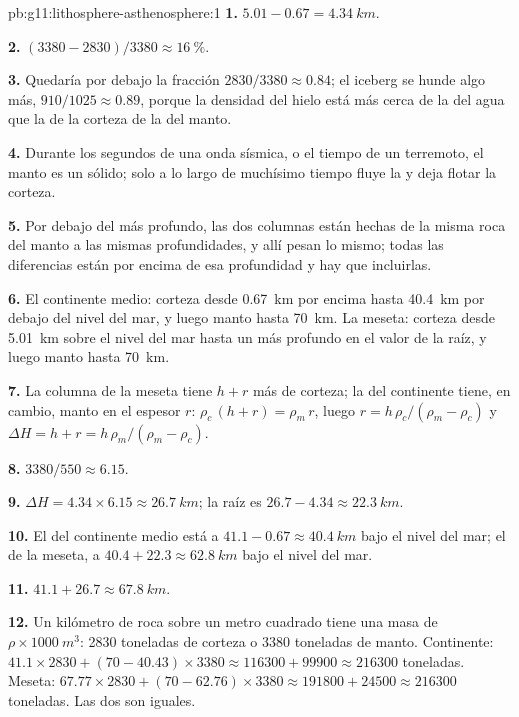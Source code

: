 \begin{solution}{pb:g11:lithosphere-asthenosphere:1}
\textbf{1.} $5.01 - 0.67 = \qty{4.34}{km}$.

\textbf{2.} $(3380 - 2830)/3380 \approx \qty{16}{\percent}$.

\textbf{3.} Quedaría por debajo la fracción $2830/3380 \approx 0.84$; el
iceberg se hunde algo más, $910/1025 \approx 0.89$, porque la densidad del
hielo está más cerca de la del agua que la de la corteza de la del manto.

\textbf{4.} Durante los segundos de una onda sísmica, o el tiempo de un
terremoto, el manto es un sólido; solo a lo largo de muchísimo tiempo fluye
la  y deja flotar la corteza.

\textbf{5.} Por debajo del  más profundo, las dos columnas están hechas
de la misma roca del manto a las mismas profundidades, y allí pesan lo mismo;
todas las diferencias están por encima de esa profundidad y hay que
incluirlas.

\textbf{6.} El continente medio: corteza desde \qty{0.67}{km} por encima
hasta \qty{40.4}{km} por debajo del nivel del mar, y luego manto hasta
\qty{70}{km}. La meseta: corteza desde \qty{5.01}{km} sobre el nivel del mar
hasta un  más profundo en el valor de la raíz, y luego manto hasta
\qty{70}{km}.

\textbf{7.} La columna de la meseta tiene $h + r$ más de corteza; la del
continente tiene, en cambio, manto en el espesor $r$: $\rho_c\,(h + r) = \rho_m\,r$,
luego $r = h\,\rho_c/(\rho_m - \rho_c)$ y $\Delta H = h + r =
h\,\rho_m/(\rho_m - \rho_c)$.

\textbf{8.} $3380/550 \approx 6.15$.

\textbf{9.} $\Delta H = 4.34 \times 6.15 \approx \qty{26.7}{km}$; la raíz es
$26.7 - 4.34 \approx \qty{22.3}{km}$.

\textbf{10.} El  del continente medio está a $41.1 - 0.67 \approx
\qty{40.4}{km}$ bajo el nivel del mar; el de la meseta, a $40.4 + 22.3 \approx
\qty{62.8}{km}$ bajo el nivel del mar.

\textbf{11.} $41.1 + 26.7 \approx \qty{67.8}{km}$.

\textbf{12.} Un kilómetro de roca sobre un metro cuadrado tiene una masa de
$\rho \times \qty{1000}{m^3}$: \num{2830} toneladas de corteza o \num{3380}
toneladas de manto. Continente: $41.1 \times 2830 + (70 - 40.43) \times 3380
\approx \num{116300} + \num{99900} \approx \num{216300}$ toneladas. Meseta:
$67.77 \times 2830 + (70 - 62.76) \times 3380 \approx \num{191800} +
\num{24500} \approx \num{216300}$ toneladas. Las dos son iguales.


\end{solution}
